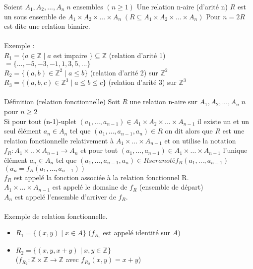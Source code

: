 
Soient $A_1,A_2, ...,A_n\;n$ ensembles $(n\geq1)$
Une relation n-aire (d'arité n) $R$ est un sous ensemble de $A_1 \times A_2 \times ... \times A_n\;(R\subseteq A_1 \times A_2 \times ... \times A_n)$
Pour $n=2 R$ est dite une relation binaire.\\
\paragraph{}
Exemple :\\
$R_1 = \{a \in \mathbb{Z} \;|\;a $ est impaire $\} \subseteq \mathbb{Z}$ (relation d'arité 1) $= \{...,-5,-3,-1,1,3,5,...\}$\\
$R_2 = \{(a,b)\in\mathbb{Z}^2 \;|\; a \leq b\}$ (relation d'arité 2) sur $\mathbb{Z}^2$\\
$R_3 = \{(a,b,c)\in\mathbb{Z}^3 \;|\; a \leq b \leq c \}$ (relation d'arité 3) sur $\mathbb{Z}^3$\\

\paragraph{}
Définition (relation fonctionnelle)
Soit $R$ une relation n-aire sur $A_1,A_2, ...,A_n\;n$ pour $n \geq 2$\\
Si pour tout (n-1)-uplet $(a_1,...,a_{n-1})\in A_1 \times A_2 \times ... \times A_{n-1}$ il existe un et un seul élément $a_n \in A_n$ tel que $(a_1,...,a_{n-1},a_n) \in R$ on dit alors que $R$ est une relation fonctionnelle relativement à $A_1 \times ... \times A_{n-1}$ et on utilise la notation $f_R : A_1 \times .. \times A_{n-1} \to A_n$ et pour tout $(a_1, ..., a_{n-1}) \in A_1 \times ... \times A_{n-1}$ l'unique élément $a_n \in A_n$ tel que $(a_1,...,a_{n-1},a_n) \in R sera noté f_R (a_1,..., a_{n-1})$\\
$(a_n = f_R (a_1,...,a_{n-1}))$\\
$f_R$ est appelé la fonction associée à la relation fonctionnel R.\\
$A_1 \times ... \times A_{n-1}$ est appelé le domaine de $f_R$ (ensemble de départ)\\
$A_n$ est appelé l'ensemble d'arriver de $f_R$.\\
\paragraph{}
Exemple de relation fonctionnelle.

\begin{itemize}
	\item $R_1 = \{(x,y)\;|\; x \in A\}$ ($f_{R_1}$ est appelé identité sur $A$)
	\item $R_2 = \{(x,y,x+y)\;|\; x,y \in \mathbb{Z}\}$\\
	($f_{R_2} : \mathbb{Z} \times \mathbb{Z} \to \mathbb{Z}$ avec $f_{R_2}(x,y)=x+y$)
\end{itemize}

